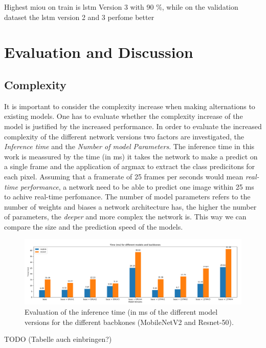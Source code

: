 \documentclass[11pt,
  paper=a4, 
  bibliography=totocnumbered,
	captions=tableheading,
	BCOR=10mm
]{scrreprt}
\theoremstyle{definition}
\def \figwidth {0.9\linewidth}
\begin{document}
Highest \gls{miou} on train is \gls{lstm} Version 3 with 90 \%, while on the validation dataset the \gls{lstm} version 2 and 3 perfome better

\chapter{Evaluation and Discussion} 

\section{Complexity}\label{sec:complexity}
It is important to consider the complexity increase when making alternations to existing models.
One has to evaluate whether the complexity increase of the model is justified by the increased performance.
In order to evaluate the increased complexity of the different network versions two factors are investigated, the \textit{Inference time} and the \textit{Number of model Parameters}.
The inference time in this work is meassured by the time (in \gls{ms}) it takes the network to make a predict on a single frame and the application of argmax to extract the class predicitons for each pixel.
Assuming that a framerate of 25 frames per seconds would mean \textit{real-time performance}, a network need to be able to predict one image within 25 \gls{ms} to achive real-time perfomance.
The number of model parameters refers to the number of weights and biases a network architecture has, the higher the number of parameters, the \textit{deeper} and more complex the network is.
This way we can compare the size and the prediction speed of the models.


\begin{figure}[H]
	\centering
	\includegraphics[width=\figwidth]{time_results}
	\caption[Inference Time Results]{
		Evaluation of the inference time (in \gls{ms} of the different model versions for the different bacbkones (MobileNetV2 and Resnet-50).  
		\label{fig:Inference_time}}
\end{figure}
TODO (Tabelle auch einbringen?)
\end{document}

